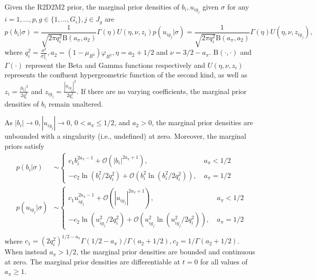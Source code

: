 \begin{prop}
\label{prop:marginalpriors}
Given the R2D2M2 prior, the marginal prior densities of $b_i, u_{ig_j}$ given $\sigma$ for any $i=1,...,p, g\in \{1,..., G_i\}, j\in J_g$ are
\begin{subequations}
    \begin{equation}
    p(b_i|\sigma)= \frac{1}{ \sqrt{2\pi q_i^2}\text{B}(a_\pi, a_2) }\Gamma(\eta) U( \eta, \nu,z_i)
    \end{equation}
    \begin{equation}
    p(u_{ig_j}|\sigma)=\frac{1}{ \sqrt{2\pi q_i^2}\text{B}(a_\pi, a_2) }\Gamma(\eta) U( \eta, \nu,z_{ig_j}),
    \end{equation}
\end{subequations}
where $q_i^2=\frac{\sigma^2}{\sigma_{x_i}^2},a_2=(1-\mu_{R^2})\varphi_{R^2}, \eta=a_2+1/2$ and $\nu= 3/2-a_\pi$. $\text{B}(\cdot,\cdot)$ and $\Gamma(\cdot)$ represent the Beta and Gamma functions respectively and $U(\eta, \nu, z_i)$ represents the confluent hypergeometric function of the second kind, as well as $z_i=\frac{|b_i|^2}{2q_i^2}$ and $z_{ig_j}=\frac{|u_{ig_j}|^2}{2q_i^2}$. If there are no varying coefficients, the marginal prior densities of $b_i$ remain unaltered.
\end{prop}
\begin{prop}
\label{prop:originprior}
As $|b_i|\to 0, |u_{ig_j}| \to 0$, $0<a_\pi \leq 1/2$, and $a_2>0$, the marginal prior densities are unbounded with a singularity (i.e., undefined) at zero.  Moreover, the marginal priors satisfy
\begin{align*}
    p(b_i|\sigma)&\sim
    \begin{cases}
        c_1 b_i^{2a_\pi-1}+\mathcal{O}\left( |b_i|^{2a_\pi+1} \right), \  &a_\pi<1/2 \\
         -c_2 \ln (b_i^2/ 2q_i^2)+\mathcal{O}\left(  b_i^2 \ln (b_i^2/ 2q_i^2) \right), \ &a_\pi=1/2
    \end{cases} \\
    p(u_{ig_j}|\sigma)&\sim
    \begin{cases}
        c_1 u_{ig_j}^{2a_\pi-1}+\mathcal{O}\left( |u_{ig_j}|^{2a_\pi+1} \right), \  &a_\pi<1/2 \\
         -c_2 \ln (u_{ig_j}^2/2q_i^2)+\mathcal{O}\left(  u_{ig_j}^2 \ln (u_{ig_j}^2/ 2q_i^2) \right), \ &a_\pi=1/2
    \end{cases} \\
\end{align*}
where $c_1= (2q_i^2)^{1/2-a_\pi} \Gamma(1/2-a_\pi)/\Gamma(a_2+1/2), c_2=1/\Gamma(a_2+1/2)$. When instead $a_\pi>1/2$, the marginal prior densities are bounded and continuous at zero. The marginal prior densities are differentiable at $t=0$ for all values of $a_\pi\geq 1$.
\end{prop}
